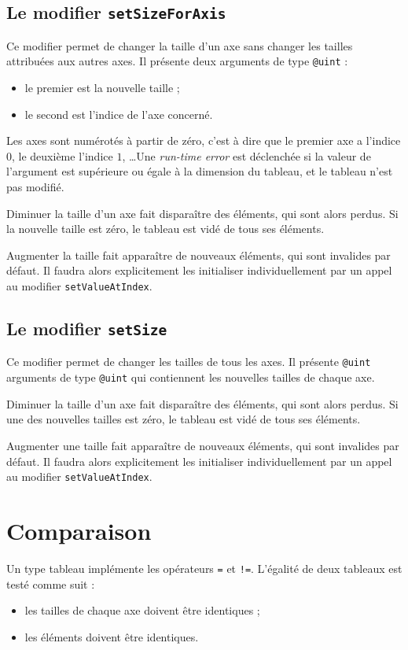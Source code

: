 \subsection{Le modifier \lstinline[language=galgas]!setSizeForAxis!}

Ce modifier permet de changer la taille d'un axe sans changer les tailles attribuées aux autres axes. Il présente deux arguments de type \lstinline[language=galgas]!@uint! :
\begin{itemize}
  \item le premier est la nouvelle taille ;
  \item le second est l'indice de l'axe concerné.
\end{itemize}

Les axes sont numérotés à partir de zéro, c'est à dire que le premier axe a l'indice $0$, le deuxième l'indice $1$, \dots Une \emph{run-time error} est déclenchée si la valeur de l'argument est supérieure ou égale à la dimension du tableau, et le tableau n'est pas modifié.
 
Diminuer la taille d'un axe fait disparaître des éléments, qui sont alors perdus. Si la nouvelle taille est zéro, le tableau est vidé de tous ses éléments.

Augmenter la taille fait apparaître de nouveaux éléments, qui sont invalides par défaut. Il faudra alors explicitement les initialiser individuellement par un appel au modifier \lstinline[language=galgas]!setValueAtIndex!.




\subsection{Le modifier \lstinline[language=galgas]!setSize!}

Ce modifier permet de changer les tailles de tous les axes. Il présente \lstinline[language=galgas]!@uint! arguments de type \lstinline[language=galgas]!@uint! qui contiennent les nouvelles tailles de chaque axe.

Diminuer la taille d'un axe fait disparaître des éléments, qui sont alors perdus. Si une des nouvelles tailles est zéro, le tableau est vidé de tous ses éléments.

Augmenter une taille fait apparaître de nouveaux éléments, qui sont invalides par défaut. Il faudra alors explicitement les initialiser individuellement par un appel au modifier \lstinline[language=galgas]!setValueAtIndex!.


\section{Comparaison}

Un type tableau implémente les opérateurs \lstinline[language=galgas]!=! et \lstinline[language=galgas]+!=+. L'égalité de deux tableaux est testé comme suit :
\begin{itemize}
  \item les tailles de chaque axe doivent être identiques ;
  \item les éléments doivent être identiques.
\end {itemize}
